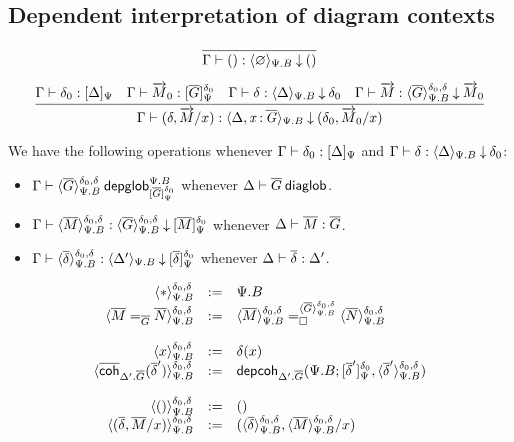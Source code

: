 \subsection{Dependent interpretation of diagram contexts}

\[\infer
  {\ofinterpdep{\Gamma}{()}{\emptyctx}{\Psi.B}{()}}
  {}
\]

\[
\infer
  {\ofinterpdep{\Gamma}{(\delta,\tel M/x)}
   {\Delta,\tptm{x}{\diag G}}{\Psi.B}{(\delta_0,\tel M_0/x)}}
  {\ofinterp{\Gamma}{\delta_0}{\Delta}{\Psi}
  & \ofglob{\Gamma}{\tel M_0}{\interpglob{\diag G}{\Psi}{\delta_0}}
  & \ofinterpdep{\Gamma}{\delta}{\Delta}{\Psi.B}{\delta_0}
  & \ofdepglob{\Gamma}{\tel M}{\interpdepglob{\diag G}{\Psi.B}{\delta_0}{\delta}}{\tel M_0}}
\]

We have the following operations whenever
$\ofinterp{\Gamma}{\delta_0}{\Delta}{\Psi}$ and
$\ofinterpdep{\Gamma}{\delta}{\Delta}{\Psi.B}{\delta_0}$:

\begin{itemize}
\item
$\wfdepglob{\Gamma}{\interpdepglob{\diag G}{\Psi.B}{\delta_0}{\delta}}{\Psi.B}
  {\interpglob{\diag G}{\Psi}{\delta_0}}$
whenever
$\wfdiaglob{\Delta}{\diag G}$.

\item
$\ofdepglob{\Gamma}{\interpdepglob{\diag M}{\Psi.B}{\delta_0}{\delta}}
 {\interpdepglob{\diag G}{\Psi.B}{\delta_0}{\delta}}
 {\interpglob{\diag M}{\Psi}{\delta_0}}$
whenever
$\ofdiaglob{\Delta}{\diag M}{\diag G}$.

\item
$\ofinterpdep{\Gamma}
  {\interpdepglob{\diag\delta}{\Psi.B}{\delta_0}{\delta}}{\Delta'}{\Psi.B}
  {\interpglob{\diag\delta}{\Psi}{\delta_0}}$
whenever
$\ofdiaglob{\Delta}{\diag\delta}{\Delta'}$.
\end{itemize}

\[
  \begin{array}{rcl}
    \interpdepglob{\diagbase}{\Psi.B}{\delta_0}{\delta} & := & \Psi.B \\
    \interpdepglob{\homj{\diag G}{\diag M}{\diag N}}{\Psi.B}{\delta_0}{\delta} & := &
    \dhomj
      {\interpdepglob{\diag G}{\Psi.B}{\delta_0}{\delta}}
      {\interpdepglob{\diag M}{\Psi.B}{\delta_0}{\delta}}
      {\interpdepglob{\diag N}{\Psi.B}{\delta_0}{\delta}}
      {\blank}
    \\\\

    \interpdepglob{x}{\Psi.B}{\delta_0}{\delta} & := & \delta(x) \\
    \interpdepglob
      {\diagcoh{\Delta'.\diag{G}}{\diag \delta'}}{\Psi.B}{\delta_0}{\delta} & := &
    \depcoh{\Delta'.\diag G}{\Psi.B}
      {\interpglob{\diag\delta'}{\Psi}{\delta_0}}
      {\interpdepglob{\diag\delta'}{\Psi.B}{\delta_0}{\delta}} \\\\

    \interpdepglob{()}{\Psi.B}{\delta_0}{\delta} & := & () \\
    \interpdepglob{(\diag \delta,\diag M/x)}{\Psi.B}{\delta_0}{\delta} & := &
    (\interpdepglob{\diag\delta}{\Psi.B}{\delta_0}{\delta},\interpdepglob{\diag
    M}{\Psi.B}{\delta_0}{\delta}/x)
  \end{array}
\]


